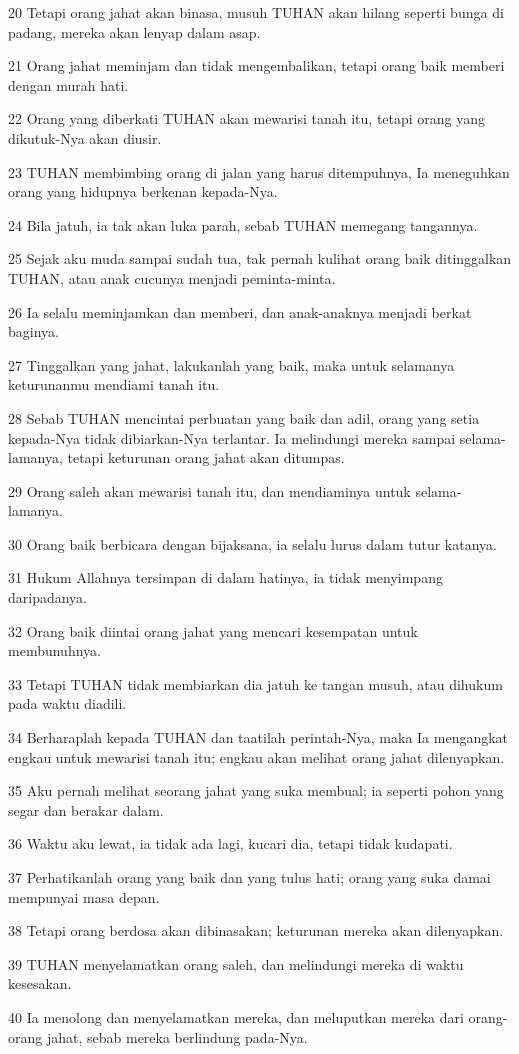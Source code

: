 \par 20 Tetapi orang jahat akan binasa, musuh TUHAN akan hilang seperti bunga di padang, mereka akan lenyap dalam asap.
\par 21 Orang jahat meminjam dan tidak mengembalikan, tetapi orang baik memberi dengan murah hati.
\par 22 Orang yang diberkati TUHAN akan mewarisi tanah itu, tetapi orang yang dikutuk-Nya akan diusir.
\par 23 TUHAN membimbing orang di jalan yang harus ditempuhnya, Ia meneguhkan orang yang hidupnya berkenan kepada-Nya.
\par 24 Bila jatuh, ia tak akan luka parah, sebab TUHAN memegang tangannya.
\par 25 Sejak aku muda sampai sudah tua, tak pernah kulihat orang baik ditinggalkan TUHAN, atau anak cucunya menjadi peminta-minta.
\par 26 Ia selalu meminjamkan dan memberi, dan anak-anaknya menjadi berkat baginya.
\par 27 Tinggalkan yang jahat, lakukanlah yang baik, maka untuk selamanya keturunanmu mendiami tanah itu.
\par 28 Sebab TUHAN mencintai perbuatan yang baik dan adil, orang yang setia kepada-Nya tidak dibiarkan-Nya terlantar. Ia melindungi mereka sampai selama-lamanya, tetapi keturunan orang jahat akan ditumpas.
\par 29 Orang saleh akan mewarisi tanah itu, dan mendiaminya untuk selama-lamanya.
\par 30 Orang baik berbicara dengan bijaksana, ia selalu lurus dalam tutur katanya.
\par 31 Hukum Allahnya tersimpan di dalam hatinya, ia tidak menyimpang daripadanya.
\par 32 Orang baik diintai orang jahat yang mencari kesempatan untuk membunuhnya.
\par 33 Tetapi TUHAN tidak membiarkan dia jatuh ke tangan musuh, atau dihukum pada waktu diadili.
\par 34 Berharaplah kepada TUHAN dan taatilah perintah-Nya, maka Ia mengangkat engkau untuk mewarisi tanah itu; engkau akan melihat orang jahat dilenyapkan.
\par 35 Aku pernah melihat seorang jahat yang suka membual; ia seperti pohon yang segar dan berakar dalam.
\par 36 Waktu aku lewat, ia tidak ada lagi, kucari dia, tetapi tidak kudapati.
\par 37 Perhatikanlah orang yang baik dan yang tulus hati; orang yang suka damai mempunyai masa depan.
\par 38 Tetapi orang berdosa akan dibinasakan; keturunan mereka akan dilenyapkan.
\par 39 TUHAN menyelamatkan orang saleh, dan melindungi mereka di waktu kesesakan.
\par 40 Ia menolong dan menyelamatkan mereka, dan meluputkan mereka dari orang-orang jahat, sebab mereka berlindung pada-Nya.

